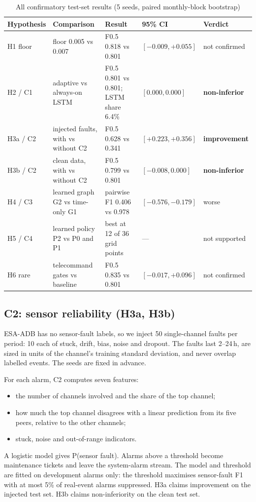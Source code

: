 \documentclass[conference]{IEEEtran}
\begin{document}
\begin{table}[t]
\caption{All confirmatory test-set results (5 seeds, paired monthly-block bootstrap)}\label{tab:summary}
\centering
\begin{tabular}{lllll}
\toprule
Hypothesis & Comparison & Result & 95\% CI & Verdict \\
\midrule
H1 floor & floor 0.005 vs 0.007 & F0.5 0.818 vs 0.801 & $[-0.009, +0.055]$ & not confirmed \\
H2 / C1 & adaptive vs always-on LSTM & F0.5 0.801 vs 0.801; LSTM share 6.4\% & $[0.000, 0.000]$ & \textbf{non-inferior} \\
H3a / C2 & injected faults, with vs without C2 & F0.5 0.628 vs 0.341 & $[+0.223, +0.356]$ & \textbf{improvement} \\
H3b / C2 & clean data, with vs without C2 & F0.5 0.799 vs 0.801 & $[-0.008, 0.000]$ & \textbf{non-inferior} \\
H4 / C3 & learned graph G2 vs time-only G1 & pairwise F1 0.406 vs 0.978 & $[-0.576, -0.179]$ & worse \\
H5 / C4 & learned policy P2 vs P0 and P1 & best at 12 of 36 grid points & --- & not supported \\
H6 rare & telecommand gates vs baseline & F0.5 0.835 vs 0.801 & $[-0.017, +0.096]$ & not confirmed \\
\bottomrule
\end{tabular}
\end{table}

\subsection{C2: sensor reliability (H3a, H3b)}
ESA-ADB has no sensor-fault labels, so we inject 50 single-channel faults per period: 10 each of stuck, drift, bias, noise and dropout. The faults last 2--24\,h, are sized in units of the channel's training standard deviation, and never overlap labelled events. The seeds are fixed in advance.

For each alarm, C2 computes seven features:
\begin{itemize}
\item the number of channels involved and the share of the top channel;
\item how much the top channel disagrees with a linear prediction from its five peers, relative to the other channels;
\item stuck, noise and out-of-range indicators.
\end{itemize}
A logistic model gives P(sensor fault). Alarms above a threshold become maintenance tickets and leave the system-alarm stream. The model and threshold are fitted on development alarms only: the threshold maximises sensor-fault F1 with at most 5\% of real-event alarms suppressed. H3a claims improvement on the injected test set. H3b claims non-inferiority on the clean test set.
\end{document}
